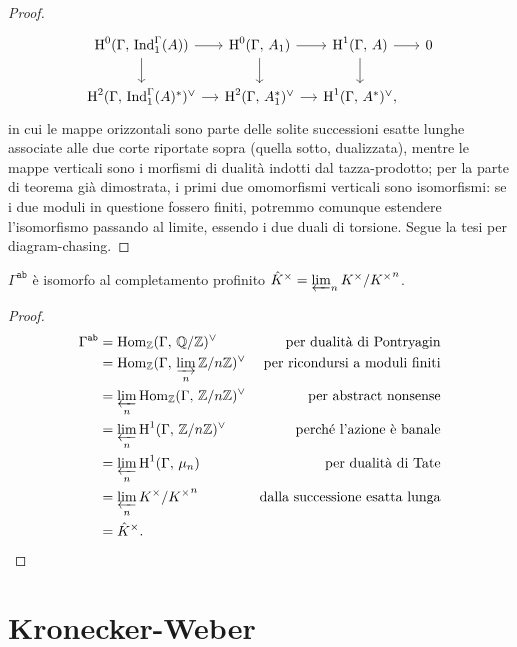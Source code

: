 \begin{proof}
\[\begin{tikzcd}[column sep = small]
	\HH^0(\Gamma, \, \Ind_1^\Gamma(A)) \rar\dar
	& \HH^0(\Gamma, \, A_1) \rar\dar
	& \HH^1(\Gamma, \, A) \rar\dar
	& 0 \\
	\HH^2(\Gamma, \, \Ind_1^\Gamma(A)^*)^\vee \rar
	& \HH^2(\Gamma, \, A_1^*)^\vee \rar
	& \HH^1(\Gamma, \, A^*)^\vee,
	&
	\end{tikzcd}  \]
	in cui le mappe orizzontali sono parte delle solite successioni esatte lunghe associate alle due corte riportate sopra (quella sotto, dualizzata), mentre le mappe verticali sono i morfismi di dualità indotti dal tazza-prodotto; per la parte di teorema già dimostrata, i primi due omomorfismi verticali sono isomorfismi: se i due moduli in questione fossero finiti, potremmo comunque estendere l'isomorfismo passando al limite, essendo i due duali di torsione. Segue la tesi per diagram-chasing.
\end{proof}


\begin{corollary}
	$ \Gamma^\mathtt{ab} $ è isomorfo al completamento profinito $ \hat{K}^\times = \varprojlim_n K^\times/ {K^\times}^n $.
\end{corollary}
\begin{proof}
	\begin{align*}
		\Gamma^\mathtt{ab}
		& = \operatorname{Hom}_{\mathbb{Z}}(\Gamma,\, \mathbb{Q}/\mathbb{Z})^\vee & \text{per dualità di Pontryagin} \\
		& = \operatorname{Hom}_{\mathbb{Z}}(\Gamma,\, \varinjlim_n \mathbb{Z}/n\mathbb{Z})^\vee & \text{per ricondursi a moduli finiti}\\ 
		& = \varprojlim_n \operatorname{Hom}_{\mathbb{Z}}(\Gamma,\, \mathbb{Z}/n\mathbb{Z})^\vee & \text{per abstract nonsense} \\
		& = \varprojlim_n \operatorname{H}^1(\Gamma,\, \mathbb{Z}/n\mathbb{Z})^\vee & \text{perché l'azione è banale} \\
		& = \varprojlim_n \operatorname{H}^1(\Gamma,\, \mu_n) & \text{per dualità di Tate} \\
		& = \varprojlim_n K^\times / {K^\times}^n & \text{dalla successione esatta lunga} \\
		& = \hat{K}^\times. 
	\end{align*}
\end{proof}

\section{Kronecker-Weber}